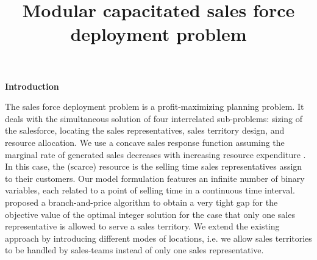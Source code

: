 \documentclass[12pt]{scrartcl}
\title{Modular capacitated sales force deployment problem}
\begin{document}
\maketitle

\begin{section}{\textbf{Introduction}}




The sales force deployment problem is a profit-maximizing planning problem. It deals with the simultaneous solution of four interrelated sub-problems: sizing of the salesforce, locating the sales representatives, sales territory design, and resource allocation. We use a concave sales response function assuming the marginal rate of generated sales decreases with increasing resource expenditure \citep{Drexl1999,Skiera1998}. In this case, the (scarce) resource is the selling time sales representatives assign to their customers. Our model formulation features an infinite number of binary variables, each related to a point of selling time in a continuous time interval. \cite{Haase2014} proposed a branch-and-price algorithm to obtain a very tight gap for the objective value of the optimal integer solution for the case that only one sales representative is allowed to serve a sales territory. We extend the existing approach by introducing different modes of locations, i.e. we allow sales territories to be handled by sales-teams instead of only one sales representative.

\end{section}
\end{document}
